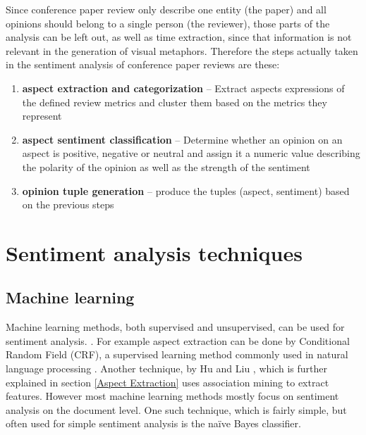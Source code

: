  Since conference paper review only describe one entity (the paper) and all opinions should belong to a single person (the reviewer), those parts of the analysis can be left out, as well as time extraction, since that information is not relevant in the generation of visual metaphors. Therefore the steps actually taken in the sentiment analysis of conference paper reviews are these:
 \begin{enumerate}
    \item \textbf{aspect extraction and categorization} -- Extract aspects expressions of the defined review metrics and cluster them based on the metrics they represent
    \item \textbf{aspect sentiment classification} -- Determine whether an opinion on an aspect is positive, negative or neutral and assign it a numeric value describing the polarity of the opinion as well as the strength of the sentiment
    \item \textbf{opinion tuple generation} -- produce the tuples (aspect, sentiment) based on the previous steps
    \end{enumerate}
\section{Sentiment analysis techniques}
\subsection{Machine learning}
Machine learning methods, both supervised and unsupervised, can be used for sentiment analysis. \cite{liu_2015}. For example aspect extraction can be done by Conditional Random Field (CRF), a supervised learning method commonly used in natural language processing \cite{schouten_2016}. Another technique, by Hu and Liu \cite{hu_liu_2015}, which is further explained in section \ref{Aspect Extraction} uses association mining to extract features. However most machine learning methods mostly focus on sentiment analysis on the document level.
 One such technique, which is fairly simple, but often used for simple sentiment analysis is the na\"ive Bayes classifier.
 

